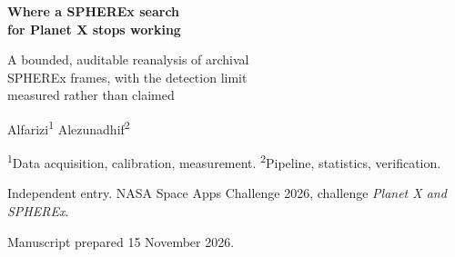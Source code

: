\documentclass[11pt,a4paper]{article}
\begin{document}
\thispagestyle{empty}
\vspace*{18mm}
\noindent{\color{rule}\rule{\textwidth}{0.9pt}}\par
\vspace{7mm}
\begin{center}
{\LARGE\bfseries Where a SPHEREx search\\[2.5mm] for Planet X stops working\par}
\end{center}
\vspace{6mm}
\begin{center}
{\large A bounded, auditable reanalysis of archival\\[1mm] SPHEREx frames, with the detection limit\\[1mm] measured rather than claimed\par}
\end{center}
\vspace{5mm}
\noindent{\color{rule}\rule{\textwidth}{0.4pt}}\par
\vspace{12mm}

\begin{center}
{\large Alfarizi\textsuperscript{1} \quad Alezunadhif\textsuperscript{2}\par}
\end{center}
\vspace{4mm}
\begin{center}
{\small\textsuperscript{1}Data acquisition, calibration, measurement.\quad
\textsuperscript{2}Pipeline, statistics, verification.\par}
\end{center}
\vspace{4mm}
\begin{center}
{\small Independent entry. NASA Space Apps Challenge 2026, challenge \emph{Planet X and SPHEREx}.\par}
\end{center}
\vspace{4mm}
\begin{center}
{\small Manuscript prepared 15 November 2026.\par}
\end{center}

\vfill
\end{document}
